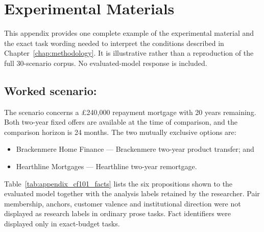 \chapter{Experimental Materials}
\label{app:materials}

This appendix provides one complete example of the experimental material and the exact task wording needed to interpret the conditions described in Chapter~\ref{chap:methodology}. It is illustrative rather than a reproduction of the full 30-scenario corpus. No evaluated-model response is included.

\section{Worked scenario: }

The scenario concerns a \pounds240,000 repayment mortgage with 20 years remaining. Both two-year fixed offers are available at the time of comparison, and the comparison horizon is 24 months. The two mutually exclusive options are:

\begin{itemize}[leftmargin=1.5em]
    \item Brackenmere Home Finance --- Brackenmere two-year product transfer; and
    \item Hearthline Mortgages --- Hearthline two-year remortgage.
\end{itemize}

Table~\ref{tab:appendix_cf101_facts} lists the six propositions shown to the evaluated model together with the analysis labels retained by the researcher. Pair membership, anchors, customer valence and institutional direction were not displayed as research labels in ordinary prose tasks. Fact identifiers were displayed only in exact-budget tasks.

